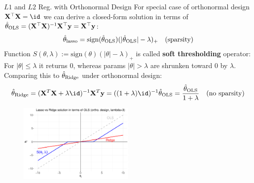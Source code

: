 \documentclass[11pt,compress,t,notes=noshow, xcolor=table]{beamer}
\begin{document}
\begin{vbframe}{$L1$ and $L2$ Reg. with Orthonormal Design}
\small For special case of orthonormal design $\Xmat^{\top}\Xmat=\id$ we can derive a closed-form solution in terms of $\hat{\theta}_{\text{OLS}}=(\mathbf{X}^{\top}\mathbf{X})^{-1}\mathbf{X}^{\top}\mathbf{y}=\mathbf{X}^{\top}\mathbf{y}$:
\vspace{-0.1cm}
$$\thetah_{\text{lasso}}=\text{sign}(\thetah_{\text{OLS}})(\vert \thetah_{\text{OLS}} \vert - \lambda)_{+}\quad(\text{sparsity})\vspace{-0.1cm}$$
Function $S(\theta,\lambda):=\text{sign}(\theta)(|\theta|-\lambda)_{+}$ is called \textbf{soft thresholding} operator: For $|\theta|\leq\lambda$ it returns $0$, whereas params $|\theta|>\lambda$ are shrunken toward $0$ by $\lambda$.\\
Comparing this to $\hat{\theta}_{\text{Ridge}}$ under orthonormal design: %
\vspace{-0.3cm}
$$\thetah_{\text{Ridge}}= ({\Xmat}^T \Xmat  + \lambda \id)^{-1} \Xmat^T\yv=((1+\lambda)\id)^{-1}\thetah_{\text{OLS}} = \frac{\thetah_{\text{OLS}}}{1+\lambda}\quad (\text{no sparsity})\vspace{-0.22cm}$$
\vspace{-0.16cm}
\begin{figure}
\includegraphics[width=0.5\textwidth]{figure_man/soft-thresholding.pdf}\\
\end{figure}

\end{vbframe}
\end{document}
